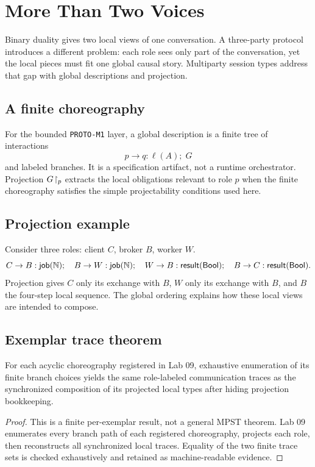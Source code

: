 \chapter{More Than Two Voices}

Binary duality gives two local views of one conversation. A three-party protocol introduces a different problem: each role sees only part of the conversation, yet the local pieces must fit one global causal story. Multiparty session types address that gap with global descriptions and projection.

\section{A finite choreography}
For the bounded \texttt{PROTO-M1} layer, a global description is a finite tree of interactions
\[
p\to q : \ell(A);\;G
\]
and labeled branches. It is a specification artifact, not a runtime orchestrator. Projection $G\!\upharpoonright_{p}$ extracts the local obligations relevant to role $p$ when the finite choreography satisfies the simple projectability conditions used here.



\section{Projection example}
Consider three roles: client $C$, broker $B$, worker $W$.
\[
C\to B:\mathsf{job}(\mathbb{N});
\quad
B\to W:\mathsf{job}(\mathbb{N});
\quad
W\to B:\mathsf{result}(\mathsf{Bool});
\quad
B\to C:\mathsf{result}(\mathsf{Bool}).
\]
Projection gives $C$ only its exchange with $B$, $W$ only its exchange with $B$, and $B$ the four-step local sequence. The global ordering explains how these local views are intended to compose.



\section{Exemplar trace theorem}
\begin{proposition}
For each acyclic choreography registered in Lab 09, exhaustive enumeration of its finite branch choices yields the same role-labeled communication traces as the synchronized composition of its projected local types after hiding projection bookkeeping.
\end{proposition}
\begin{proof}
This is a finite per-exemplar result, not a general MPST theorem. Lab 09 enumerates every branch path of each registered choreography, projects each role, then reconstructs all synchronized local traces. Equality of the two finite trace sets is checked exhaustively and retained as machine-readable evidence.
\end{proof}

